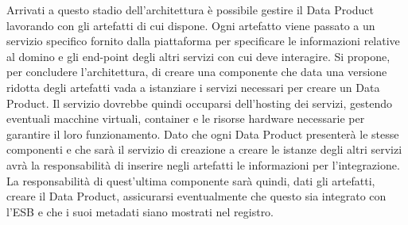 \documentclass[12pt]{report}
\begin{document}
Arrivati a questo stadio dell'architettura è possibile gestire il Data Product lavorando con gli artefatti di cui dispone.
Ogni artefatto viene passato a un servizio specifico fornito dalla piattaforma per specificare le informazioni relative al domino e gli end-point degli altri servizi con cui deve interagire.
Si propone, per concludere l'architettura, di creare una componente che data una versione ridotta degli artefatti vada a istanziare i servizi necessari per creare un Data Product.
Il servizio dovrebbe quindi occuparsi dell'hosting dei servizi, gestendo eventuali macchine virtuali, container e le risorse hardware necessarie per garantire il loro funzionamento. 
Dato che ogni Data Product presenterà le stesse componenti e che sarà il servizio di creazione a creare le istanze degli altri servizi avrà la responsabilità di inserire negli artefatti le informazioni per l'integrazione.
La responsabilità di quest'ultima componente sarà quindi, dati gli artefatti, creare il Data Product, assicurarsi eventualmente che questo sia integrato con l'ESB e che i suoi metadati siano mostrati nel registro.
\end{document}
